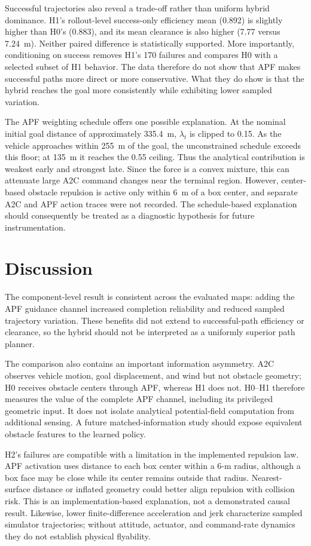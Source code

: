 \documentclass[conference]{IEEEtran}
\begin{document}
Successful trajectories also reveal a trade-off rather than uniform hybrid dominance. H1's rollout-level success-only efficiency mean (0.892) is slightly higher than H0's (0.883), and its mean clearance is also higher (7.77 versus 7.24~m). Neither paired difference is statistically supported. More importantly, conditioning on success removes H1's 170 failures and compares H0 with a selected subset of H1 behavior. The data therefore do not show that APF makes successful paths more direct or more conservative. What they do show is that the hybrid reaches the goal more consistently while exhibiting lower sampled variation.

The APF weighting schedule offers one possible explanation. At the nominal initial goal distance of approximately 335.4~m, $\lambda_t$ is clipped to 0.15. As the vehicle approaches within 255~m of the goal, the unconstrained schedule exceeds this floor; at 135~m it reaches the 0.55 ceiling. Thus the analytical contribution is weakest early and strongest late. Since the force is a convex mixture, this can attenuate large A2C command changes near the terminal region. However, center-based obstacle repulsion is active only within 6~m of a box center, and separate A2C and APF action traces were not recorded. The schedule-based explanation should consequently be treated as a diagnostic hypothesis for future instrumentation.

\section{Discussion}\label{sec:discussion}
The component-level result is consistent across the evaluated maps: adding the APF guidance channel increased completion reliability and reduced sampled trajectory variation. These benefits did not extend to successful-path efficiency or clearance, so the hybrid should not be interpreted as a uniformly superior path planner.

The comparison also contains an important information asymmetry. A2C observes vehicle motion, goal displacement, and wind but not obstacle geometry; H0 receives obstacle centers through APF, whereas H1 does not. H0--H1 therefore measures the value of the complete APF channel, including its privileged geometric input. It does not isolate analytical potential-field computation from additional sensing. A future matched-information study should expose equivalent obstacle features to the learned policy.

H2's failures are compatible with a limitation in the implemented repulsion law. APF activation uses distance to each box center within a 6-m radius, although a box face may be close while its center remains outside that radius. Nearest-surface distance or inflated geometry could better align repulsion with collision risk. This is an implementation-based explanation, not a demonstrated causal result. Likewise, lower finite-difference acceleration and jerk characterize sampled simulator trajectories; without attitude, actuator, and command-rate dynamics they do not establish physical flyability.
\end{document}
